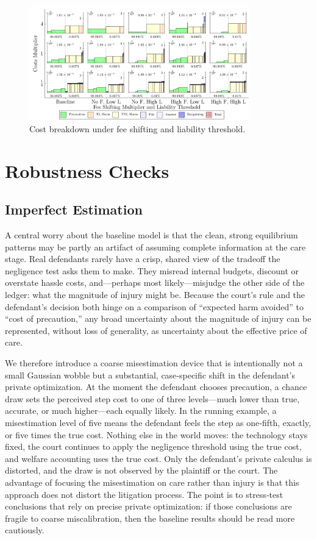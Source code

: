 \documentclass{article}
\begin{document}
\begin{figure}[ht]
  \centering
  \includegraphics[width=0.85\textwidth]{../Figures/Cost Breakdown Fee Shifting Multiplier and Liability Threshold (All Rows).pdf}
  \caption{Cost breakdown under fee shifting and liability threshold.}
  \label{fig:fee_liability}
\end{figure} 

\section{Robustness Checks}

\FloatBarrier
\subsection{Imperfect Estimation}

A central worry about the baseline model is that the clean, strong equilibrium patterns may be partly an artifact of assuming complete information at the care stage. Real defendants rarely have a crisp, shared view of the tradeoff the negligence test asks them to make. They misread internal budgets, discount or overstate hassle costs, and—perhaps most likely—misjudge the other side of the ledger: what the magnitude of injury might be. Because the court’s rule and the defendant’s decision both hinge on a comparison of “expected harm avoided” to “cost of precaution,” any broad uncertainty about the magnitude of injury can be represented, without loss of generality, as uncertainty about the effective price of care.

We therefore introduce a coarse misestimation device that is intentionally not a small Gaussian wobble but a substantial, case‑specific shift in the defendant’s private optimization. At the moment the defendant chooses precaution, a chance draw sets the perceived step cost to one of three levels—much lower than true, accurate, or much higher—each equally likely. In the running example, a misestimation level of five means the defendant feels the step as one‑fifth, exactly, or five times the true cost. Nothing else in the world moves: the technology stays fixed, the court continues to apply the negligence threshold using the true cost, and welfare accounting uses the true cost. Only the defendant’s private calculus is distorted, and the draw is not observed by the plaintiff or the court. The advantage of focusing the misestimation on care rather than injury is that this approach does not distort the litigation process. The point is to stress‑test conclusions that rely on precise private optimization: if those conclusions are fragile to coarse miscalibration, then the baseline results should be read more cautiously.
\end{document}
